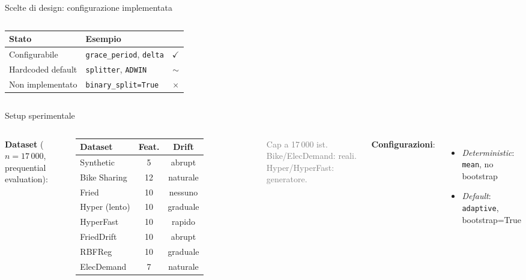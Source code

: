 \documentclass[aspectratio=169,10pt]{beamer}
\begin{document}
\begin{frame}[shrink=15]{Scelte di design: configurazione implementata}
\begin{columns}[T]
    \medskip
    \begin{tabular}{@{}ll@{\;}c@{}}
      \toprule
      \textbf{Stato} & \textbf{Esempio} & \\
      \midrule
      Configurabile & \texttt{grace\_period}, \texttt{delta} & \textcolor{adwingreen}{$\checkmark$} \\
      Hardcoded default & \texttt{splitter}, \texttt{ADWIN} & \textcolor{capyorange}{$\sim$} \\
      Non implementato & \texttt{binary\_split=True} & \textcolor{driftred}{$\times$} \\
      \bottomrule
    \end{tabular}
  \end{columns}
\end{frame}

\begin{frame}{Setup sperimentale}
  \begin{columns}[T]
    \textbf{Dataset} ($n=17\,000$, prequential evaluation):
    \smallskip
    \footnotesize
    \begin{tabular}{@{}lcc@{}}
      \toprule
      Dataset & Feat. & Drift \\
      \midrule
      Synthetic    & 5  & abrupt \\
      Bike Sharing & 12 & naturale \\
      Fried        & 10 & nessuno \\
      Hyper (lento)& 10 & graduale \\
      HyperFast    & 10 & rapido \\
      FriedDrift   & 10 & abrupt \\
      RBFReg       & 10 & graduale \\
      ElecDemand   & 7  & naturale \\
      \bottomrule
    \end{tabular}

    \smallskip
    {\footnotesize\textcolor{gray}{Cap a 17\,000 ist.
    Bike/ElecDemand: reali. Hyper/HyperFast: generatore.}}

    \smallskip
    \footnotesize\textbf{Configurazioni}:
    \begin{itemize}
      \item \textit{Deterministic}: \texttt{mean}, no bootstrap
      \item \textit{Default}: \texttt{adaptive}, bootstrap=True
    \end{itemize}


\end{columns}
\end{frame}
\end{document}
